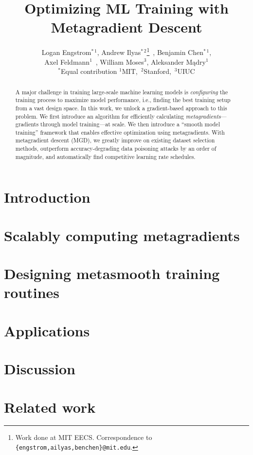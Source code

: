 \documentclass{article}
\title{Optimizing ML Training with Metagradient Descent}
\author{
    Logan Engstrom${}^{*\,1}$,
    Andrew Ilyas${}^{*\,2}$\stepcounter{footnote}\footnote{Work done at MIT EECS. Correspondence to \texttt{\{engstrom,ailyas,benchen\}@mit.edu}.}\ ,
    Benjamin Chen${}^{*\,1}$, \\
    Axel Feldmann${}^{1}$\ ,
    William Moses${}^{3}$,
    Aleksander M\k{a}dry${}^{1}$ \\[.5em]
    {\normalsize $^*$Equal contribution \qquad $^1$MIT,\ $^2$Stanford,\ $^3$UIUC}
}
\date{}
\begin{document}
\maketitle
\vspace{-1em}
\begin{abstract}
    A major challenge in training large-scale machine learning models 
    is {\em configuring} the training process to maximize model performance,
    i.e.,
    finding the best training setup from a vast design space. 
    In this work, we unlock a gradient-based approach to this problem.
    We first introduce an algorithm for efficiently calculating 
    \textit{metagradients}---gradients through model training---at scale.
    We then introduce a ``smooth model training'' framework
    that enables effective optimization using metagradients.
    With metagradient descent (MGD), we greatly improve on existing
    dataset selection methods, outperform accuracy-degrading
    data poisoning attacks by an order of magnitude, 
    and automatically find competitive learning rate schedules.
\end{abstract}

\section{Introduction}


\section{Scalably computing metagradients}
\label{sec:computing}


\section{Designing metasmooth training routines} %
\label{sec:localpred}


\section{Applications}
\label{sec:apps}


\section{Discussion}
\label{sec:discussion}


\section{Related work}
\label{sec:related}

\end{document}
